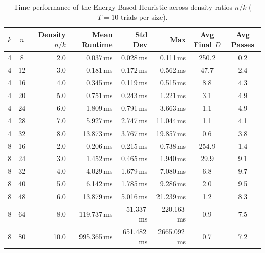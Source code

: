 \documentclass[11pt,a4paper]{article}
\begin{document}
\begin{table}[H]
\centering

\footnotesize
\setlength{\tabcolsep}{4pt}
\caption{Time performance of the Energy-Based Heuristic across density ratios $n/k$ ($T=10$ trials per size).}
\label{tab:energy_runtime}
\begin{tabular}{ccrrrrcc}
\toprule
$k$ & $n$ & Density $n/k$ & Mean Runtime & Std Dev & Max & Avg Final $D$ & Avg Passes \\
\midrule
4 & 8  & 2.0 & 0.037\,ms  & 0.028\,ms  & 0.111\,ms   & 250.2 & 0.2 \\
4 & 12 & 3.0 & 0.181\,ms  & 0.172\,ms  & 0.562\,ms   & 47.7  & 2.4 \\
4 & 16 & 4.0 & 0.345\,ms  & 0.119\,ms  & 0.515\,ms   & 8.8   & 4.3 \\
4 & 20 & 5.0 & 0.751\,ms  & 0.243\,ms  & 1.221\,ms   & 3.1   & 4.9 \\
4 & 24 & 6.0 & 1.809\,ms  & 0.791\,ms  & 3.663\,ms   & 1.1   & 4.9 \\
4 & 28 & 7.0 & 5.927\,ms  & 2.747\,ms  & 11.044\,ms  & 1.1   & 4.1 \\
4 & 32 & 8.0 & 13.873\,ms & 3.767\,ms  & 19.857\,ms  & 0.6   & 3.8 \\
\midrule
8 & 16 & 2.0 & 0.206\,ms  & 0.215\,ms  & 0.738\,ms   & 254.9 & 1.4 \\
8 & 24 & 3.0 & 1.452\,ms  & 0.465\,ms  & 1.940\,ms   & 29.9  & 9.1 \\
8 & 32 & 4.0 & 4.029\,ms  & 1.679\,ms  & 7.080\,ms   & 6.8   & 9.7 \\
8 & 40 & 5.0 & 6.142\,ms  & 1.785\,ms  & 9.286\,ms   & 2.0   & 9.5 \\
8 & 48 & 6.0 & 13.879\,ms & 5.016\,ms  & 21.239\,ms  & 1.2   & 8.3 \\
8 & 64 & 8.0 & 119.737\,ms & 51.337\,ms & 220.163\,ms & 0.9  & 7.5 \\
8 & 80 & 10.0 & 995.365\,ms & 651.482\,ms & 2665.092\,ms & 0.7 & 7.2 \\
\bottomrule
\end{tabular}
\end{table}
\end{document}
